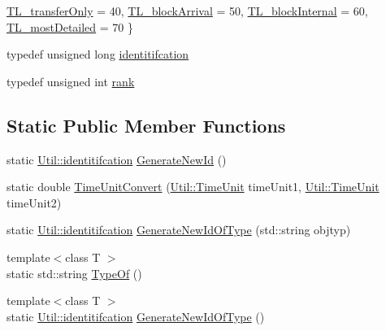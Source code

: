 \begin{DoxyCompactItemize}
\hyperlink{class_util_a604561d00f5999b5ca280401140e58d9a8b8962b6e41245523e7d7b967f582272}{T\-L\-\_\-transfer\-Only} = 40, 
\hyperlink{class_util_a604561d00f5999b5ca280401140e58d9a3a33606fc3e2b432131173eeed280d9a}{T\-L\-\_\-block\-Arrival} = 50, 
\hyperlink{class_util_a604561d00f5999b5ca280401140e58d9a3bf34b905a3128734e417619af900d0e}{T\-L\-\_\-block\-Internal} = 60, 
\hyperlink{class_util_a604561d00f5999b5ca280401140e58d9a64fd55e7b2e7fa00956ebc5185cef8b0}{T\-L\-\_\-most\-Detailed} = 70
 \}
\item 
typedef unsigned long \hyperlink{class_util_ad17d458d9344b10bba64347e514d6d71}{identitifcation}
\item 
typedef unsigned int \hyperlink{class_util_a2a402b3a3a889d699bb3a1a87cbe6d1e}{rank}
\end{DoxyCompactItemize}
\subsection*{Static Public Member Functions}
\begin{DoxyCompactItemize}
\item 
static \hyperlink{class_util_ad17d458d9344b10bba64347e514d6d71}{Util\-::identitifcation} \hyperlink{class_util_a59ecba8027c38a9d0a3a0e9e9dc94ad7}{Generate\-New\-Id} ()
\item 
static double \hyperlink{class_util_a5f537febaa83db4721745a4730657bab}{Time\-Unit\-Convert} (\hyperlink{class_util_aadbd82055afeaa7d4fb4da513de628ff}{Util\-::\-Time\-Unit} time\-Unit1, \hyperlink{class_util_aadbd82055afeaa7d4fb4da513de628ff}{Util\-::\-Time\-Unit} time\-Unit2)
\item 
static \hyperlink{class_util_ad17d458d9344b10bba64347e514d6d71}{Util\-::identitifcation} \hyperlink{class_util_a96dd76236d7f5888b8dac562e93f9278}{Generate\-New\-Id\-Of\-Type} (std\-::string objtyp)
\item 
{\footnotesize template$<$class T $>$ }\\static std\-::string \hyperlink{class_util_a1010d1207367e48e1d417381f32abf1f}{Type\-Of} ()
\item 
{\footnotesize template$<$class T $>$ }\\static \hyperlink{class_util_ad17d458d9344b10bba64347e514d6d71}{Util\-::identitifcation} \hyperlink{class_util_aec5f31f4f467113c25a6aef7bb5f4a40}{Generate\-New\-Id\-Of\-Type} ()
\end{DoxyCompactItemize}
